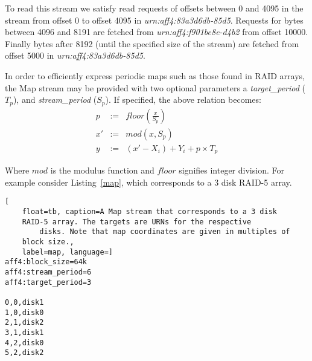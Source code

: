\documentclass[10pt, conference]{IEEEtran}
\begin{document}
To read this stream we satisfy read requests of offsets between 0 and
4095 in the stream from offset 0 to offset 4095 in
\emph{urn:aff4:83a3d6db-85d5}. Requests for bytes between 4096 and 8191 are
fetched from \emph{urn:aff4:f901be8e-d4b2} from offset 10000. Finally
bytes after 8192 (until the specified size of the stream) are fetched
from offset 5000 in \emph{urn:aff4:83a3d6db-85d5}.

In order to efficiently express periodic maps such as those found in
RAID arrays, the Map stream may be provided with two optional
parameters a {\em target\_period} ($T_p$), and {\em stream\_period}
($S_p$). If specified, the above relation becomes:
\begin{eqnarray*}
p &:=& floor\left (\frac{x}{S_p} \right) \\
x' &:=& mod(x ,S_p)  \\   \label{eq:no1}
y &:=& (x'-X_i) + Y_i + p \times T_p
\end{eqnarray*}

Where $mod$ is the modulus function and $floor$ signifies integer
division. For example consider Listing~\ref{map}, which corresponds to a 3
disk RAID-5 array.

\begin{lstlisting}[
	float=tb, caption=A Map stream that corresponds to a 3 disk
	RAID-5 array. The targets are URNs for the respective
        disks. Note that map coordinates are given in multiples of 
	block size.,
	label=map, language=]
aff4:block_size=64k 
aff4:stream_period=6 
aff4:target_period=3

0,0,disk1
1,0,disk0
2,1,disk2
3,1,disk1
4,2,disk0
5,2,disk2
\end{lstlisting}



\end{document}
